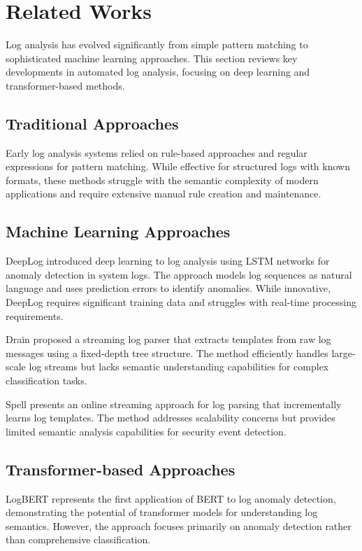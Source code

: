 \documentclass[conference]{IEEEtran}
\begin{document}
\section{Related Works}

Log analysis has evolved significantly from simple pattern matching to sophisticated machine learning approaches. This section reviews key developments in automated log analysis, focusing on deep learning and transformer-based methods.

\subsection{Traditional Approaches}

Early log analysis systems relied on rule-based approaches and regular expressions for pattern matching. While effective for structured logs with known formats, these methods struggle with the semantic complexity of modern applications and require extensive manual rule creation and maintenance.

\subsection{Machine Learning Approaches}

DeepLog \cite{du2017deeplog} introduced deep learning to log analysis using LSTM networks for anomaly detection in system logs. The approach models log sequences as natural language and uses prediction errors to identify anomalies. While innovative, DeepLog requires significant training data and struggles with real-time processing requirements.

Drain \cite{he2017drain} proposed a streaming log parser that extracts templates from raw log messages using a fixed-depth tree structure. The method efficiently handles large-scale log streams but lacks semantic understanding capabilities for complex classification tasks.

Spell \cite{du2016spell} presents an online streaming approach for log parsing that incrementally learns log templates. The method addresses scalability concerns but provides limited semantic analysis capabilities for security event detection.

\subsection{Transformer-based Approaches}

LogBERT \cite{guo2021logbert} represents the first application of BERT to log anomaly detection, demonstrating the potential of transformer models for understanding log semantics. However, the approach focuses primarily on anomaly detection rather than comprehensive classification.
\end{document}
